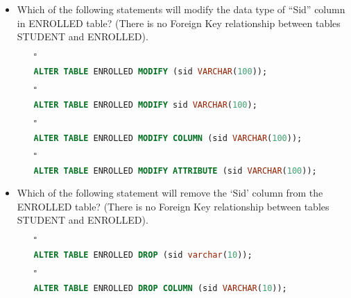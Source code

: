 \documentclass[10pt]{article}
\begin{document}
\begin{itemize}
			\item Which of the following statements will modify the data type of “Sid” column in ENROLLED table? (There is no Foreign Key relationship between tables STUDENT and ENROLLED).
				\begin{enumerate}
					\item[$\square$] 
						\begin{lstlisting}[language=SQL,firstline=1, lastline=1, numbers = right] 
							ALTER TABLE ENROLLED MODIFY (sid VARCHAR(100));
						\end{lstlisting}
					
					\item[$\square$] 
						\begin{lstlisting}[language=SQL,firstline=1, lastline=1, numbers = right] 
							ALTER TABLE ENROLLED MODIFY sid VARCHAR(100);
						\end{lstlisting}
					
					\item[$\square$] 
						\begin{lstlisting}[language=SQL,firstline=1, lastline=1, numbers = right] 
							ALTER TABLE ENROLLED MODIFY COLUMN (sid VARCHAR(100));
						\end{lstlisting}
				
					\item[$\square$] 
						\begin{lstlisting}[language=SQL,firstline=1, lastline=1, numbers = right] 
							ALTER TABLE ENROLLED MODIFY ATTRIBUTE (sid VARCHAR(100));
						\end{lstlisting}
				\end{enumerate}
			
			\item Which of the following statement will remove the ‘Sid’ column from the ENROLLED table? (There is no Foreign Key relationship between tables STUDENT and ENROLLED).
				\begin{enumerate}
					\item[$\square$] 
						\begin{lstlisting}[language=SQL,firstline=1, lastline=1, numbers = right] 
							ALTER TABLE ENROLLED DROP (sid varchar(10));
						\end{lstlisting}
					
					\item[$\square$] 
						\begin{lstlisting}[language=SQL,firstline=1, lastline=1, numbers = right] 
							ALTER TABLE ENROLLED DROP COLUMN (sid VARCHAR(10));
						\end{lstlisting}
					

\end{enumerate}
\end{itemize}
\end{document}
